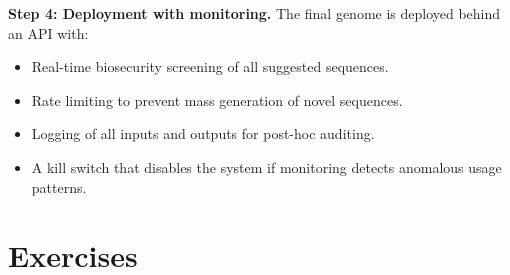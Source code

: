 \begin{example}
\textbf{Step 4: Deployment with monitoring.}
The final genome is deployed behind an API with:
\begin{itemize}[leftmargin=1.5em]
  \item Real-time biosecurity screening of all suggested sequences.
  \item Rate limiting to prevent mass generation of novel sequences.
  \item Logging of all inputs and outputs for post-hoc auditing.
  \item A kill switch that disables the system if monitoring detects anomalous usage patterns.
\end{itemize}
\end{example}

\section{Exercises}
\label{sec:ch17-exercises}

